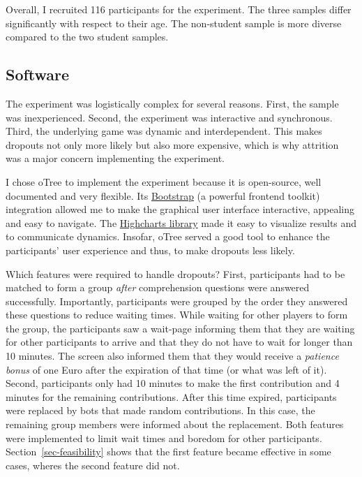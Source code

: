 \documentclass[
  authoryear,
  preprint,
  3p]{elsarticle}
\begin{document}
Overall, I recruited 116 participants for the experiment. The three
samples differ significantly with respect to their age. The non-student
sample is more diverse compared to the two student samples.

\hypertarget{sec-software}{%
\subsection{Software}\label{sec-software}}

The experiment was logistically complex for several reasons. First, the
sample was inexperienced. Second, the experiment was interactive and
synchronous. Third, the underlying game was dynamic and interdependent.
This makes dropouts not only more likely but also more expensive, which
is why attrition was a major concern implementing the experiment.

I chose oTree \citep{oTree} to implement the experiment because it is
open-source, well documented and very flexible. Its
\href{https://getbootstrap.com/}{Bootstrap} (a powerful frontend
toolkit) integration allowed me to make the graphical user interface
interactive, appealing and easy to navigate. The
\href{https://www.highcharts.com/}{Highcharts library} made it easy to
visualize results and to communicate dynamics. Insofar, oTree served a
good tool to enhance the participants' user experience and thus, to make
dropouts less likely.

Which features were required to handle dropouts? First, participants had
to be matched to form a group \emph{after} comprehension questions were
answered successfully. Importantly, participants were grouped by the
order they answered these questions to reduce waiting times. While
waiting for other players to form the group, the participants saw a
wait-page informing them that they are waiting for other participants to
arrive and that they do not have to wait for longer than 10 minutes. The
screen also informed them that they would receive a \emph{patience
bonus} of one Euro after the expiration of that time (or what was left
of it). Second, participants only had 10 minutes to make the first
contribution and 4 minutes for the remaining contributions. After this
time expired, participants were replaced by bots that made random
contributions. In this case, the remaining group members were informed
about the replacement. Both features were implemented to limit wait
times and boredom for other participants. Section~\ref{sec-feasibility}
shows that the first feature became effective in some cases, wheres the
second feature did not.
\end{document}
